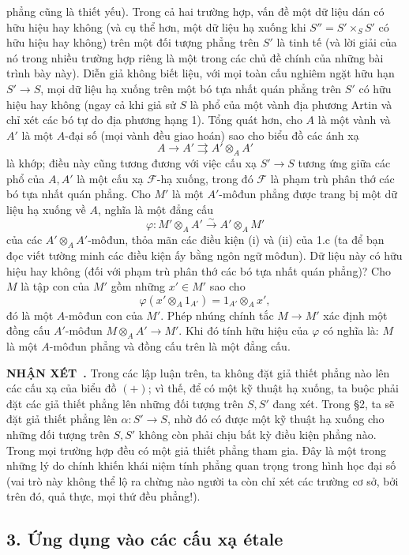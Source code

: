 \documentclass[11pt,twoside,openany]{book}
\numberwithin{equation}{section}
\newcommand{\src}[1]{%
  \phantomsection\hypertarget{src:\fgasourceid:#1}{}%
  \marginpar{\raggedleft\footnotesize\sffamily #1}%
}
\newcommand{\fgasourceid}{unset}
\newcommand{\result}[2]{\par\medskip\noindent\textbf{#1\if\relax\detokenize{#2}\relax\else\ #2\fi.}\quad}
\begin{document}
\src{307}
phẳng cũng là thiết yếu). Trong cả hai trường hợp, vấn đề một dữ liệu dán có
hữu hiệu hay không (và cụ thể hơn, một dữ liệu hạ xuống khi
$S''=S'\times_SS'$ có hữu hiệu hay không) trên một đối tượng phẳng trên $S'$
là tinh tế (và lời giải của nó trong nhiều trường hợp riêng là một trong các
chủ đề chính của những bài trình bày này). Diễn giả không biết liệu, với mọi
toàn cấu nghiêm ngặt hữu hạn $S'\longrightarrow S$, mọi dữ liệu hạ xuống trên
một bó tựa nhất quán phẳng trên $S'$ có hữu hiệu hay không (ngay cả khi giả sử
$S$ là phổ của một vành địa phương Artin và chỉ xét các bó tự do địa phương
hạng 1). Tổng quát hơn, cho $A$ là một vành và $A'$ là một $A$-đại số (mọi
vành đều giao hoán) sao cho biểu đồ các ánh xạ
\[
  A\longrightarrow A'\rightrightarrows A'\otimes_AA'
\]
là khớp; điều này cũng tương đương với việc cấu xạ $S'\longrightarrow S$ tương
ứng giữa các phổ của $A,A'$ là một cấu xạ $\mathcal F$-hạ xuống, trong đó
$\mathcal F$ là phạm trù phân thớ các bó tựa nhất quán phẳng. Cho $M'$ là một
$A'$-môđun phẳng được trang bị một dữ liệu hạ xuống về $A$, nghĩa là một đẳng
cấu
\[
  \varphi:M'\otimes_AA'\xrightarrow{\sim}A'\otimes_AM'
\]
của các $A'\otimes_AA'$-môđun, thỏa mãn các điều kiện (i) và (ii) của 1.c (ta
để bạn đọc viết tường minh các điều kiện ấy bằng ngôn ngữ môđun). Dữ liệu này
có hữu hiệu hay không (đối với phạm trù phân thớ các bó tựa nhất quán phẳng)?
Cho $M$ là tập con của $M'$ gồm những $x'\in M'$ sao cho
\[
  \varphi(x'\otimes_A1_{A'})=1_{A'}\otimes_Ax',
\]
đó là một $A$-môđun con của $M'$. Phép nhúng chính tắc
$M\longrightarrow M'$ xác định một đồng cấu $A'$-môđun
$M\otimes_AA'\longrightarrow M'$. Khi đó tính hữu hiệu của $\varphi$ có nghĩa
là: $M$ là một $A$-môđun phẳng và đồng cấu trên là một đẳng cấu.

\result{NHẬN XÉT}{} Trong các lập luận trên, ta không đặt giả thiết phẳng nào
lên các cấu xạ của biểu đồ $(+)$; vì thế, để có một kỹ thuật hạ xuống, ta buộc
phải đặt các giả thiết phẳng lên những đối tượng trên $S,S'$ đang xét. Trong
§2, ta sẽ đặt giả thiết phẳng lên $\alpha:S'\longrightarrow S$, nhờ đó có được
một kỹ thuật hạ xuống cho những đối tượng trên $S,S'$ không còn phải chịu bất
kỳ điều kiện phẳng nào. Trong mọi trường hợp đều có một giả thiết phẳng tham
gia. Đây là một trong những lý do chính khiến khái niệm tính phẳng quan trọng
trong hình học đại số (vai trò này không thể lộ ra chừng nào người ta còn chỉ
xét các trường cơ sở, bởi trên đó, quả thực, mọi thứ đều phẳng!).

\src{308}
\subsection*{3. Ứng dụng vào các cấu xạ étale}
\end{document}
